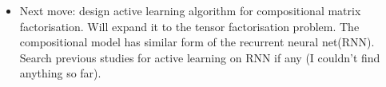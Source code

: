 \documentclass{article}
\theoremstyle{definition}
\begin{document}
\begin{itemize}
\item Next move: design active learning algorithm for compositional matrix factorisation\cite{silva2012active}. Will expand it to the tensor factorisation problem. The compositional model has similar form of the recurrent neural net(RNN). Search previous studies for active learning on RNN if any (I couldn't find anything so far).

\end{itemize}




\end{document}

